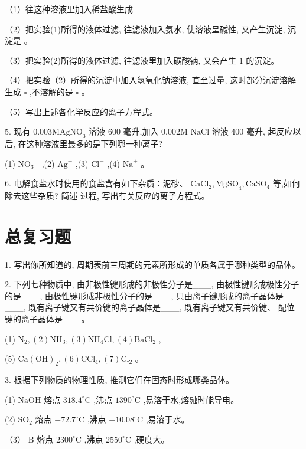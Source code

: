 \documentclass[10pt]{article}
\begin{document}
（1）往这种溶液里加入稀盐酸生成

（2）把实验(1)所得的液体过滤, 往滤液加入氨水, 使溶液呈碱性, 又产生沉淀, 沉淀是 。

（3）把实验(2)所得的液体过滤, 往滤液里加入碳酸钠, 又会产生 \(1\) 的沉淀。

（4）把实验（2）所得的沉淀中加入氢氧化钠溶液, 直至过量, 这时部分沉淀溶解生成 \(\square\) ,不溶解的是 \(\square\) 。

（5）写出上述各化学反应的离子方程式。

5. 现有 \({0.003}{\mathrm{{MAgNO}}}_{3}\) 溶液 600 毫升,加入 \({0.002}\mathrm{M}\) \(\mathrm{{NaCl}}\) 溶液 400 毫升, 起反应以后, 在这种溶液里最多的是下列哪一种离子?

(1) \({\mathrm{{NO}}}_{3}{}^{ - }\) ,(2) \({\mathrm{{Ag}}}^{ + }\) ,(3) \({\mathrm{{Cl}}}^{ - }\) ,(4) \({\mathrm{{Na}}}^{ + }\) 。

6. 电解食盐水时使用的食盐含有如下杂质：泥砂、 \({\mathrm{{CaCl}}}_{2},{\mathrm{{MgSO}}}_{4},{\mathrm{{CaSO}}}_{4}\) 等,如何除去这些杂质? 简述 过程, 写出有关反应的离子方程式。

\section*{总复习题}

1. 写出你所知道的, 周期表前三周期的元素所形成的单质各属于哪种类型的晶体。

2. 下列七种物质中, 由非极性键形成的非极性分子是\_\_\_, 由极性键形成极性分子的是\_\_\_, 由极性键形成非极性分子的是\_\_\_, 只由离子键形成的离子晶体是\_\_\_, 既有离子键又有共价键的离子晶体是\_\_\_, 既有离子键又有共价键、 配位键的离子晶体是\_\_\_。

(1) \({\mathrm{N}}_{2},\left( 2\right) {\mathrm{{NH}}}_{3},\left( 3\right) {\mathrm{{NH}}}_{4}\mathrm{{Cl}},\left( 4\right) {\mathrm{{BaCl}}}_{2}\) ,

(5) \(\mathrm{{Ca}}{\left( \mathrm{{OH}}\right) }_{2},\left( 6\right) {\mathrm{{CCl}}}_{4},\left( 7\right) {\mathrm{{Cl}}}_{2}\) 。

3. 根据下列物质的物理性质, 推测它们在固态时形成哪类晶体。

(1) \(\mathrm{{NaOH}}\) 熔点 \({318.4}^{ \circ }\mathrm{C}\) ,沸点 \({1390}^{ \circ }\mathrm{C}\) ,易溶于水,熔融时能导电。

(2) \({\mathrm{{SO}}}_{2}\) 熔点 \(- {72.7}^{ \circ }\mathrm{C}\) ,沸点 \(- {10.08}^{ \circ }\mathrm{C}\) ,易溶于水。

（3） \(\mathrm{B}\) 熔点 \({2300}^{ \circ }\mathrm{C}\) ,沸点 \({2550}^{ \circ }\mathrm{C}\) ,硬度大。
\end{document}
